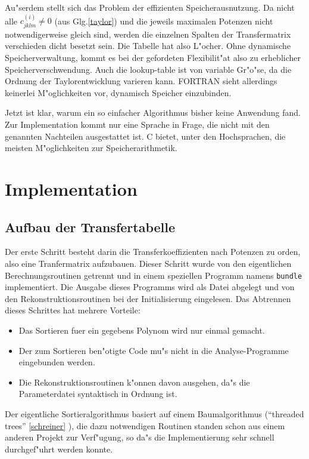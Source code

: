 Au"serdem stellt sich das Problem der effizienten Speicherausnutzung.
Da nicht alle $ c_{jklm}^{(i)} \neq 0$  (aus Glg.\ref{taylor}) und
die jeweils maximalen Potenzen nicht notwendigerweise gleich sind,
werden die einzelnen Spalten der Transfermatrix verschieden dicht 
besetzt sein. Die Tabelle hat also L"ocher. Ohne dynamische 
Speicherverwaltung, kommt es bei der gefordeten Flexibilit"at also zu 
erheblicher
Speicherverschwendung. Auch die lookup-table ist von variable Gr"o"se,
 da die Ordnung der Taylorentwicklung varieren kann.
FORTRAN sieht allerdings keinerlei M"oglichkeiten vor, dynamisch Speicher 
einzubinden. 


Jetzt ist klar, warum ein so einfacher Algorithmus bisher keine Anwendung
fand. Zur Implementation kommt nur eine Sprache in
Frage, die nicht mit den genannten Nachteilen ausgestattet ist. 
C bietet, unter den Hochsprachen, die 
meisten M"oglichkeiten zur Speicherarithmetik.

\section{Implementation}

\subsection{Aufbau der Transfertabelle}

Der erste Schritt besteht darin die Transferkoeffizienten nach Potenzen
zu orden, also eine Tranfermatrix aufzubauen. Dieser Schritt wurde
von den eigentlichen Berechnungsroutinen getrennt und in einem speziellen
Programm namens {\tt bundle} implementiert. Die Ausgabe dieses Programms
wird als Datei abgelegt und von den Rekonstruktionsroutinen bei der
Initialisierung eingelesen. 
Das Abtrennen dieses Schrittes hat mehrere Vorteile:
\begin{itemize}
\item
        Das Sortieren fuer ein gegebens Polynom wird nur einmal gemacht.
\item
        Der zum Sortieren ben"otigte Code mu"s nicht in die Analyse-Programme
        eingebunden werden.
        
\item
        Die Rekonstruktionsroutinen k"onnen davon ausgehen, da"s die
        Parameterdatei syntaktisch in Ordnung ist.
\end{itemize}

Der eigentliche Sortieralgorithmus basiert auf einem Baumalgorithmus
(``threaded trees'' \ref{schreiner} ),  die dazu notwendigen Routinen standen schon aus 
einem anderen Projekt zur  Verf"ugung, so da"s die Implementierung sehr 
schnell durchgef"uhrt werden konnte. 

